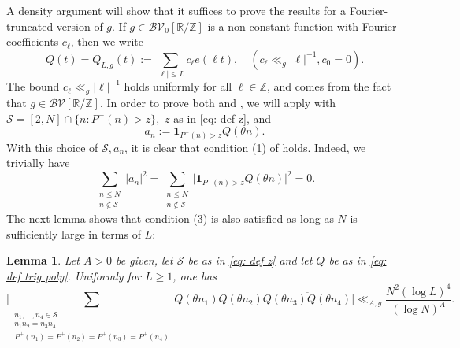 \documentclass[12pt]{amsart}
\renewcommand{\leq}{\leqslant}
\renewcommand{\geq}{\geqslant}
\numberwithin{equation}{section}
\theoremstyle{plain}
\newtheorem{lem}[thm]{Lemma}
\theoremstyle{definition}
\renewcommand{\l}{\ell}
\newcommand{\Z}{\mathbb{Z}}
\newcommand{\R}{\mathbb{R}}
\newcommand{\CB}{\mathcal{B}}
\newcommand{\CS}{\mathcal{S}}
\newcommand{\CV}{\mathcal{V}}
\begin{document}
	A density argument will show that it suffices to prove the results for a Fourier-truncated version of $g$. If $g \in \CB\CV_0[\R/\Z]$ is a non-constant function with Fourier coefficients $c_\l$, then we write
	\begin{equation}\label{eq: def trig poly}
		Q(t) = Q_{L,g}(t) := \sum_{|\l| \leq L} c_\l e(\l t), \quad (c_\l \ll_g |\l|^{-1}, c_0 = 0).
	\end{equation}
	The bound $c_\l \ll_g |\l|^{-1}$ holds uniformly for all $\l \in \Z$, and comes from the fact that $g \in \CB\CV[\R/\Z]$. In order to prove both  and , we will apply  with $\CS =  [2,N] \cap \{n : P^-(n) > z\},$ $z$ as in \eqref{eq: def z}, and $$a_n := \bm{1}_{P^-(n) > z} Q(\theta n).$$ 
	With this choice of $\CS,a_n$, it is clear that condition (1) of  holds. Indeed, we trivially have
	$$\sum_{\substack{n \leq N \\ n \not \in \CS}} |a_n|^2 = \sum_{\substack{n \leq N \\ n \not \in \CS}} \big|\bm{1}_{P^-(n) > z} Q(\theta n)\big|^2 = 0.$$
	The next lemma shows that condition (3) is also satisfied as long as $N$ is sufficiently large in terms of $L$:
	\begin{lem}\label{lem: verif cond 3}
		Let $A > 0$ be given, let $\CS$ be as in \eqref{eq: def z} and let $Q$ be as in \eqref{eq: def trig poly}. Uniformly for $L \geq 1$, one has
		$$\bigg|\sum_{\substack{n_1,\dots,n_4 \in \CS \\ n_1n_2=n_3n_4 \\ P^+(n_1)=P^+(n_2) = P^+(n_3) = P^+(n_4)}}Q(\theta n_1)Q(\theta n_2)\overline{Q(\theta n_3)Q(\theta n_4)}\bigg| \ll_{A,g} \frac{N^2 (\log L)^4}{(\log N)^A}.$$
	\end{lem}
\end{document}
